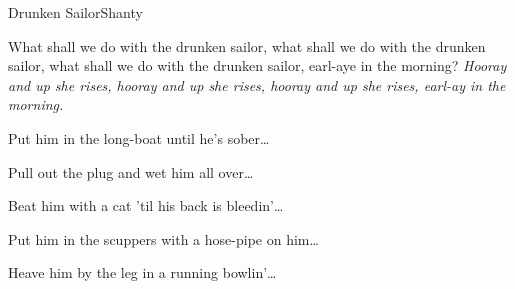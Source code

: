 \begin{sang}{Drunken Sailor}{Shanty}
\begin{vers}
What shall we do with the drunken sailor,
what shall we do with the drunken sailor,
what shall we do with the drunken sailor,
earl-aye in the morning?
\emph{Hooray and up she rises,
      hooray and up she rises,
      hooray and up she rises,
      earl-ay in the morning.}
\end{vers}
\begin{vers}
Put him in the long-boat until he's sober\dots
\end{vers}
\begin{vers}
Pull out the plug and wet him all over\dots
\end{vers}
\begin{vers}
Beat him with a cat 'til his back is bleedin'\dots
\end{vers}
\begin{vers}
Put him in the scuppers with a hose-pipe on him\dots
\end{vers}
\begin{vers}
Heave him by the leg in a running bowlin'\dots
\end{vers}
\end{sang}